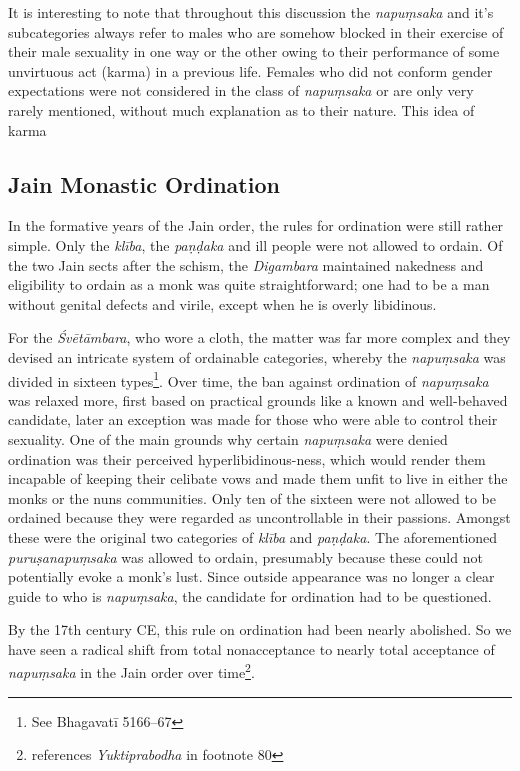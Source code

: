 It is interesting to note that throughout this discussion the {\em napuṃsaka} and it's subcategories always refer to males who are somehow blocked in their exercise of their male sexuality in one way or the other owing to their performance of some unvirtuous act (karma) in a previous life. Females who did not conform gender expectations were not considered in the class of {\em napuṃsaka} or are only very rarely mentioned, without much explanation as to their nature. This idea of karma 

\subsection{Jain Monastic Ordination}
In the formative years of the Jain order, the rules for ordination were still rather simple. Only the {\em klība}, the {\em paṇḍaka} and ill people were not allowed to ordain. Of the two Jain sects after the schism, the {\em Digambara} maintained nakedness and eligibility to ordain as a monk was quite straightforward; one had to be a man without genital defects and virile, except when he is overly libidinous. 

For the {\em Śvētāmbara}, who wore a cloth, the matter was far more complex and they devised an intricate system of ordainable categories, whereby the {\em napuṃsaka} was divided in sixteen types\footnote{See Bhagavatī 5166–67}. Over time, the ban against ordination of {\em napuṃsaka} was relaxed more, first based on practical grounds like a known and well-behaved candidate, later an exception was made for those who were able to control their sexuality. One of the main grounds why certain {\em napuṃsaka} were denied ordination was their perceived hyperlibidinous-ness, which would render them incapable of keeping their celibate vows and made them unfit to live in either the monks or the nuns communities. Only ten of the sixteen were not allowed to be ordained because they were regarded as uncontrollable in their passions. Amongst these were the original two categories of {\em klība} and {\em paṇḍaka}. The aforementioned {\em puruṣanapuṃsaka} was allowed to ordain, presumably because these could not potentially evoke a monk's lust. Since outside appearance was no longer a clear guide to who is {\em napuṃsaka}, the candidate for ordination had to be questioned. 

By the 17th century CE, this rule on ordination had been nearly abolished. So we have seen a radical shift from total nonacceptance to nearly total acceptance of {\em napuṃsaka} in the Jain order over time\footnote{\cite{zwilling} references {\em Yuktiprabodha} in footnote 80}.


